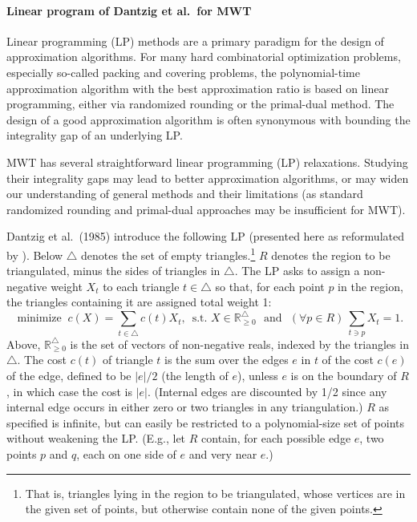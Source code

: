 \documentclass[final]{siamltex}
\newcommand{\Rp}{\mathbb{R}_{\ge 0}}
\newcommand{\cost}{c}
\newcommand{\edge}{e}
\newcommand{\region}{R}
\newcommand{\tri}{t}  \newcommand{\vertex}{v}
\newcommand{\fracTriang}{X}
\begin{document}
\paragraph{Linear program of Dantzig et al.~for MWT}
Linear programming (LP) methods are a primary paradigm
for the design of approximation algorithms.
For many hard combinatorial optimization problems, 
especially so-called packing and covering problems,
the polynomial-time approximation algorithm with the best approximation ratio
is based on linear programming,
either via randomized rounding or the primal-dual method.
The design of a good approximation algorithm 
is often synonymous with bounding the integrality gap
of an underlying LP.

MWT has several straightforward linear programming (LP) relaxations.
Studying their integrality gaps
may lead to better approximation algorithms,
or may widen our understanding 
of general methods and their limitations
(as standard randomized rounding and primal-dual approaches 
may be insufficient for MWT).

Dantzig et al.~(1985) introduce the following LP
(presented here as reformulated by \cite{de1996polytope}).
Below $\triangle$ denotes the set of empty triangles.\footnote
{That is, triangles lying in the region to be triangulated, 
whose vertices are in the given set of points,
but otherwise contain none of the given points.}
$\region$ denotes the region to be triangulated,
minus the sides of triangles in $\triangle$.
The LP asks to assign a non-negative weight $\fracTriang_\tri$ to
each triangle $\tri\in\triangle$ so that, for each point $p$ in the 
region, the triangles containing it are assigned total weight 1:
\begin{equation}\label{eq:LP}
  \text{ minimize }~
  \cost(\fracTriang) = \sum_{\tri\in\triangle} \cost(\tri) \fracTriang_\tri \text{{}, ~s.t. }
  \fracTriang\in\Rp^\triangle \text{ ~and~ }
  (\forall p\in \region)~\sum_{\tri\ni p} \fracTriang_\tri = 1.
\end{equation}
Above, $\Rp^\triangle$ is the set of vectors of non-negative reals, 
indexed by the triangles in $\triangle$.
The cost $\cost(\tri)$ of triangle $\tri$
is the sum over the edges $e$ in $\tri$ of the cost $\cost(\edge)$ of the edge,
defined to be $|\edge|/2$ (the length of $\edge$), unless $\edge$ is on the boundary of $\region$,
in which case the cost is $|\edge|$.
(Internal edges are discounted by 1/2 since any internal edge occurs in either zero or two triangles in any triangulation.)
$\region$ as specified is infinite, 
but can easily be restricted to a polynomial-size set of points
without weakening the LP.  (E.g., let $\region$ contain, 
for each possible edge $\edge$, two points $p$ and $q$, each on one side of $\edge$ and very near $\edge$.)
\end{document}
